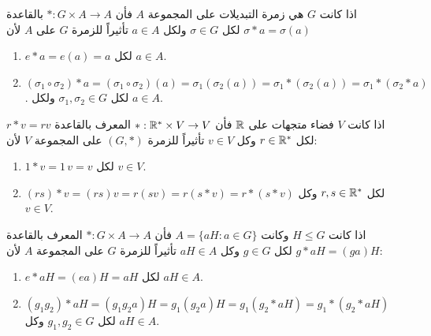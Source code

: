 \begin{example}
	اذا كانت $G$ هي زمرة التبديلات على المجموعة $A$ فأن 
	$*:G\times A \to A$ بالقاعدة
	$\sigma * a = \sigma(a)$ لكل $\sigma\in G$ ولكل $a\in A$ تأثيراً للزمرة $G$ على $A$ لأن
	\begin{enumerate}
		\item $e * a = e(a) = a$ لكل $a \in A$.
		\item $(\sigma_1 \circ \sigma_2)*a = (\sigma_1\circ\sigma_2)(a) = \sigma_1(\sigma_2(a)) = \sigma_1*(\sigma_2(a)) = \sigma_1 * (\sigma_2 * a)$. لكل 
		$\sigma_1, \sigma_2 \in G$ ولكل $a\in A$.
	\end{enumerate}
\end{example}

\begin{example}
	اذا كانت $V$ فضاء متجهات على $\mathbb{R}$ فأن 
	$* : \mathbb{R}^* \times V \to V$ المعرف بالقاعدة $r * v = rv$ لكل $r\in\mathbb{R}^*$ وكل $v\in V$ تأثيراً للزمرة $(G, *)$ على المجموعة $V$ لأن:
	\begin{enumerate}
		\item $1 * v = 1\, v = v$ لكل $v\in V$.
		\item  $(rs) * v = (rs)v = r(sv) = r(s*v) = r*(s*v)$ لكل $r,s\in\mathbb{R}^*$ وكل $v\in V$.	
	\end{enumerate}
\end{example}

%

\begin{example}
	اذا كانت $H\le G$ وكانت 
	$A=\{aH : a\in G\}$ فأن $* : G\times A \to A$ المعرف بالقاعدة \linebreak $g * aH = (ga)H$ لكل $g\in G$ وكل $aH\in A$ تأثيراً للزمرة $G$ على المجموعة $A$ لأن:
	\begin{enumerate}
		\item $e*aH = (ea)H = aH$ لكل $aH\in A$.
		\item $(g_1g_2)*aH = (g_1g_2a)H = g_1(g_2a)H=g_1(g_2*aH)=g_1*(g_2*aH)$ \linebreak
	لكل $g_1,g_2\in G$ وكل $aH\in A$.
	\end{enumerate}
\end{example}

